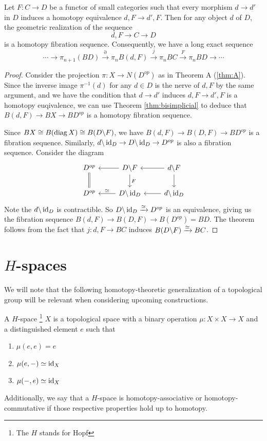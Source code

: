\begin{theorem}\label{thm:B}
 Let $F : C \to D$ be a functor of small categories such that every morphism $d \to d'$ in $D$
 induces a homotopy equivalence $d \comma F \to d' \comma F$. Then for any object $d$ of $D$,
 the geometric realization of the sequence
 \[
 d \comma F \to C \to D
 \]
 is a homotopy fibration sequence. Consequently, we have a long exact sequence 
 \[
 \cdots \to \pi_{n+1}(BD) \xrightarrow{\partial} \pi_n B(d \comma F) \xrightarrow{j} \pi_n BC \xrightarrow{F}\pi_n BD \to \cdots
 \]
\end{theorem}
\begin{proof}
Consider the projection $\pi : X \to N(D^{op})$ as in Theorem A (\ref{thm:A}).
Since the inverse image $\pi^{-1}(d)$ for any $d \in D$ is the nerve of $d \comma F$
by the same argument, and we have the condition that $d \to d'$ induces $d \comma F \to d' \comma F$ is 
a homotopy euqivalence, we can use Theorem \ref{thm:bisimplicial} to deduce that
$B(d \comma F) \to BX \to BD^{op}$ is a homotopy fibration sequence.

Since $BX \cong B(\operatorname*{diag} X) \cong B(D \backslash F)$, we have $B(d \comma F) \to B(D \comma F) \to BD^{op}$ 
is a fibration sequence.
Similarly, $d \backslash \operatorname*{id}_D \to D \backslash \operatorname*{id}_D \to D^{op}$ is also a fibration sequence.
Consider the diagram
\[
\begin{tikzcd}
D^{op} \arrow[d, equal] & D\comma F \arrow[l] \arrow[d, "F"] & d \comma F \arrow[d] \arrow[l] \\
D^{op} & D \comma \id_D \arrow[l, "\eqv"'] & d \comma \id_D \arrow[l] 
\end{tikzcd}
\]
Note the $d \backslash \operatorname*{id}_D$ is contractible. So $D \backslash \operatorname*{id}_D \xrightarrow{\simeq} D^{op}$ is an equivalence,
giving us the fibration sequence $B(d \comma F) \to B(D \comma F) \to B(D^{op}) = BD$.
The theorem follows from the fact that 
$j : d \comma F \to BC$ induces $B(D \backslash F) \xrightarrow{\simeq} BC$.

\end{proof}

\clearpage

\section{$H$-spaces}
We will note that the following homotopy-theoretic generalization of a topological group will be relevant when considering upcoming constructions.

\begin{definition}[$H$-space]
A $H$-space \footnote{The $H$ stands for Hopf} $X$ is a topological space with a binary operation $\mu : X \times X \to X$ and a distinguished element
$e$ such that 
\begin{enumerate}
  \item $\mu(e,e) = e$ 
  \item $\mu(e,-) \simeq \operatorname*{id}_X$ 
  \item $\mu(-,e) \simeq \operatorname*{id}_X$ 
\end{enumerate}
\end{definition}
Additionally, we say that a $H$-space is homotopy-associative or homotopy-commutative if those respective properties hold up to homotopy.

